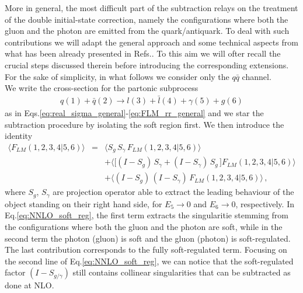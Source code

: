 \documentclass[12pt,a4paper]{article}
\newcommand{\nn}{\nonumber}
\newcommand{\beq}{\begin{eqnarray}}
\newcommand{\eeq}{\end{eqnarray}}
\begin{document}
More in general, the most difficult part of the subtraction relays on the treatment of the double initial-state correction, namely the configurations where both the gluon and the photon are emitted from the quark/antiquark. 
To deal with such contributions we will adapt the general approach and some technical aspects from what has been already presented in Refs.{\color{red}{add references}}. To this aim we will ofter recall the crucial steps discussed therein before introducing the corresponding extensions. For the sake of simplicity, in what follows we consider only the $q\bar{q}$ channel. \\
We write the cross-section for the partonic subprocess 
\beq
q(1) +\bar{q}(2) \rightarrow l(3)+\bar{l}(4)+ \gamma(5) + g(6)
\eeq
as in Eqs.\eqref{eq:real_sigma_general}-\eqref{eq:FLM_rr_general} and we star the subtraction procedure by isolating the soft region first. We then introduce the identity 
\beq
\big\langle F_{LM}(1,2,3,4|5,6) \big\rangle &=&
\big\langle S_g \, S_\gamma \, F_{LM}(1,2,3,4|5,6)\big\rangle
\nn \\
&&
+
\big\langle \big[ (I-S_g) \, S_\gamma
+
(I-S_\gamma) \, S_g \, \big] 
F_{LM}(1,2,3,4|5,6)\big\rangle
 \nn \\
&&
 +\big\langle (I-S_g)  \, (I-S_\gamma)  \, F_{LM}(1,2,3,4|5,6)\big\rangle  \, ,
\label{eq:NNLO_soft_reg}
\eeq
where $S_g$, $S_\gamma$ are projection operator able to extract the leading behaviour of the object standing on their right hand side, for $E_5 \rightarrow 0$ and $E_6 \rightarrow 0$, respectively.
In Eq.\eqref{eq:NNLO_soft_reg}, the first term extracts the singularitie stemming from the configurations where both the gluon and the photon are soft, while in the second term the photon (gluon) is soft and the gluon (photon) is soft-regulated. The last contribution corresponds to the fully soft-regulated term.
Focusing on the second line of Eq.\eqref{eq:NNLO_soft_reg}, we can notice that the soft-regulated factor $(I-S_{g/\gamma})$ still contains collinear singularities that can be subtracted as done at NLO. 

\bigskip
\bigskip
\end{document}
